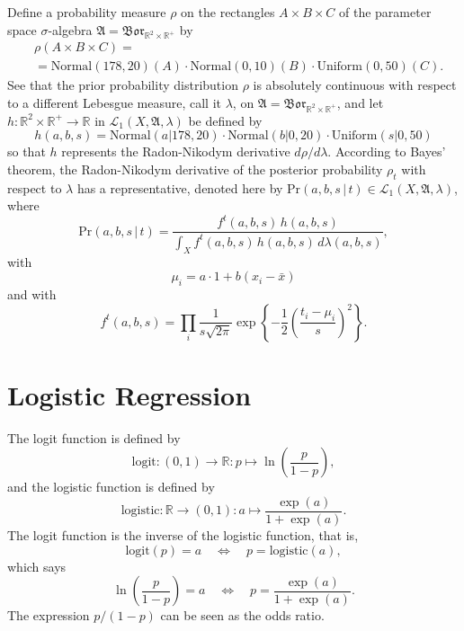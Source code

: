 \documentclass[
twoside=true,
paper=letter,
fontsize=9pt,
pagesize=auto,
leqno,
openany,
headsepline,
overfullrule,
]{scrbook}
\theoremstyle{plain}
\theoremstyle{plain}
\theoremstyle{definition}
\theoremstyle{bfnoteitalic}
\theoremstyle{bfnoteroman}
\newcommand{\sigalg}[1]{\mathfrak{#1}}
\newcommand{\cali}[1]{\mathscr{#1}}
\newcommand{\borel}{\mathfrak{Bor}}
\newcommand{\textsigma}{\hbox{\large{$\sigma$}}\kern-1pt}
\newcommand{\R}{\mathbb{R}}
\newcommand{\funcf}{f}
\newcommand{\funch}{h}
\newcommand{\function}{f}
\newcommand{\functioniii}{h}
\newcommand{\measurespace}{X}
\newcommand{\seti}{A}
\newcommand{\setii}{B}
\newcommand{\setiii}{C}
\newcommand{\pspace}{\measurespace}%
\newcommand{\pspacesig}{\sigalg{A}}
\begin{document}
Define a probability measure $\rho$ on the rectangles 
$\seti\times\setii\times\setiii$ of the parameter space \textsigma-algebra 
$\pspacesig=\borel_{\R^2\times\R^+}$ by
\begin{align*}
& \rho(\seti\times\setii\times\setiii) =
\\
& =
\text{Normal}(178,20)(\seti)\cdot
\text{Normal}(0,10)(\setii)\cdot
\text{Uniform}(0,50)(\setiii).
\end{align*}
See that the prior probability distribution $\rho$ is absolutely continuous with respect to a different Lebesgue measure, call it
$\lambda$, on $\pspacesig=\borel_{\R^2\times\R^+}$,
and let
$\funch:\R^2\times\R^+\to\R$ in
$\cali{L}_1(\pspace,\pspacesig,\lambda)$ be defined by
\[
\funch (a,b,s) =
\text{Normal}(a\vert 178,20)\cdot
\text{Normal}(b\vert 0,20)\cdot
\text{Uniform}(s\vert 0,50)
\]
so that $\functioniii$ represents the Radon-Nikodym derivative $d\rho/d\lambda$.
According to Bayes' theorem, the Radon-Nikodym derivative of the posterior probability 
$\rho_{t}$ with respect to $\lambda$ has a representative, denoted here by
$\text{Pr}(a,b,s\,\vert\, t)\in\cali{L}_1(\pspace, \pspacesig,\lambda)$,
where 
\[
\text{Pr}(a,b,s\,\vert\, t)
=
\frac{\function^{t}(a,b,s)\,\functioniii(a,b,s)}
{\int_{\pspace}\function^{t}(a,b,s)\,\functioniii(a,b,s)\,d\lambda(a,b,s)},
\]
with 
\[
\mu_i=a\cdot 1 + b(x_i-\bar x)
\]
and with
\[
\funcf^t(a,b,s) =
\prod_i
\frac{1}{s\sqrt{2\pi}}
\exp
\left\{
-\frac{1}{2}
\left(
\frac{t_i-\mu_i}{s}
\right)^2
\right\}.
\]




\section{Logistic Regression}\label{logistic_regression}
The logit function is defined by
\[
\text{logit} : (0,1) \to \R: p\mapsto \ln\left( \frac{p}{1-p} \right),
\]
and the logistic function is defined by
\[
\text{logistic}:\R\to (0,1): a\mapsto  \frac{\exp(a)}{1+\exp(a)}.
\]
The logit function is the inverse of the logistic function, that is,
\[
\text{logit}(p)=a \quad \Leftrightarrow \quad 
p = \text{logistic}(a),
\]
which says
\[
\ln\left( \frac{p}{1-p} \right) = a \quad
\Leftrightarrow \quad 
p = \frac{\exp(a)}{1+\exp(a)}.
\]
The expression
$p/(1-p)$
can be seen as the odds ratio.
\end{document}
